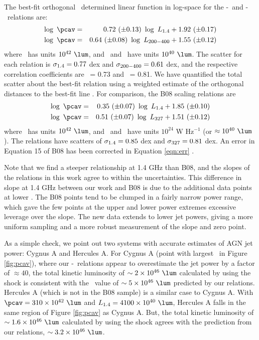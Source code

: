 \documentclass{emulateapj}
\begin{document}
The best-fit orthogonal \bces\ determined linear function in log-space
for the \pcav-\phigh\ and \pcav-\plow\ relations are:
\begin{eqnarray}
  \log~\pcav &=& 0.72~(\pm 0.13)~\log~\phigh + 1.92~(\pm 0.17) \label{eqn:high}\\
  \log~\pcav &=& 0.64~(\pm 0.08)~\log~\plow + 1.55~(\pm 0.12) \label{eqn:low}
\end{eqnarray}
where \pcav\ has units $10^{42} ~\lum$, and \phigh\ and \plow\ have
units $10^{40} ~\lum$. The scatter for each relation is $\sigma_{\mathrm{1.4}} = 0.77$
dex and $\sigma_{\mathrm{200-400}} = 0.61$ dex, and the respective correlation
coefficients are \rhigh\ = 0.73 and \rlow\ = 0.81. We have quantified
the total scatter about the best-fit relation using a weighted
estimate of the orthogonal distances to the best-fit line
\citep[see][]{2009A&A...498..361P}. For comparison, the
B08 scaling relations are
\begin{eqnarray}
  \log~\pcav &=& 0.35~(\pm 0.07)~\log~\phigh + 1.85~(\pm 0.10) \\
  \log~\pcav &=& 0.51~(\pm 0.07)~\log~\pthree + 1.51~(\pm 0.12) \label{eqn:err}
\end{eqnarray}
where \pcav\ has units $10^{42} ~\lum$, and \phigh\ and \pthree\ have
units $10^{24}$ W Hz$^{-1}$ (or $\approx 10^{40} ~\lum$). The
relations have scatters of $\sigma_{\mathrm{1.4}} = 0.85$ dex and $\sigma_{\mathrm{327}} = 0.81$
dex. An error in Equation 15 of B08 has been corrected in Equation
\ref{eqn:err} \citep{birzan08err}.

Note that we find a steeper relationship at 1.4 GHz than B08, and the
slopes of the relations in this work agree to within the
uncertainties. This difference in slope at 1.4 GHz between our work
and B08 is due to the additional data points at lower \pjet. The B08
points tend to be clumped in a fairly narrow power range, which gave
the few points at the upper and lower power extremes excessive
leverage over the slope. The new data extends to lower jet powers,
giving a more uniform sampling and a more robust measurement of the
slope and zero point.

As a simple check, we point out two systems with accurate estimates of
AGN jet power: Cygnus A and Hercules A. For Cygnus A (point with
largest \prad\ in Figure \ref{fig:pcav}), where our
\pjet-\prad\ relations appear to overestimate the jet power by
a factor of $\approx 40$, the total kinetic luminosity of $\sim
2\times10^{46} ~\lum$ calculated by \citet{2006ApJ...644L...9W} using
the shock is consistent with the \pjet\ value of $\sim 5\times10^{46}
~\lum$ predicted by our relations. Hercules A (which is not in the B08
sample) is a similar case to Cygnus A. With $\pcav = 310\times10^{42}
~\lum$ and $\phigh = 4100\times10^{40} ~\lum$, Hercules A falls in the
same region of Figure \ref{fig:pcav} as Cygnus A. But, the total
kinetic luminosity of $\sim 1.6\times10^{46} ~\lum$ calculated by
\citet{herca} using the shock agrees with the prediction from our
relations, $\sim 3.2\times10^{46} ~\lum$.
\end{document}
